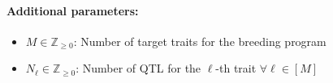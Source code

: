 \documentclass[12pt, a4paper, bibliography=totoc]{scrartcl}
\begin{document}
\paragraph{Additional parameters:}
		\begin{itemize}
			\item $M \in \mathbb{Z}_{\ge0}$: Number of target traits for the breeding program
			\item $N_{\ell} \in \mathbb{Z}_{\ge0}$: Number of QTL for the $\ell$-th trait $ \forall \ell \in [M]$

\iffalse %
			\item $P^{k,\ell} \in \mathbb{B}^{N_\ell\times2}$: The population matrix for each individual $k\in[K]$ and trait $\ell \in [M]$, where:
	\begin{align*}
		P_{i,j}^{k,\ell}=
		\left\{
		\begin{array}{ll}
		0, & \text{ if $L^{k,\ell}_{i,j} = 0$},\\
		1, & \text{otherwise,}
		\end{array}
		\right.&\forall i \in [N_{\ell}],\ j \in [2],
	\end{align*}
	where $L^{k,\ell}$ is the genotype matrix for $k$-th individual corresponding to the $\ell$-th trait.
\fi
		\end{itemize}
 		
\end{document}
